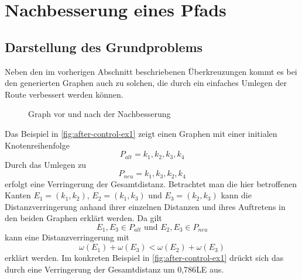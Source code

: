\section{Nachbesserung eines Pfads}
\label{sec:after-control}
\subsection{Darstellung des Grundproblems}
Neben den im vorherigen Abschnitt beschriebenen Überkreuzungen kommt es bei den generierten Graphen auch zu solchen, die durch ein einfaches Umlegen der Route verbessert werden können.

\begin{figure}[h]
    \begin{center}
    
    \hfil
    \end{center}
    \caption{Graph vor und nach der Nachbesserung}
    \label{fig:after-control-ex1}
\end{figure}

Das Beispiel in \vref{fig:after-control-ex1} zeigt einen Graphen mit einer initialen Knotenreihenfolge
$$P_{alt} = k_1,k_2,k_3,k_4$$
Durch das Umlegen zu
$$P_{neu} =k_1,k_3,k_2,k_4$$
erfolgt eine Verringerung der Gesamtdistanz.
Betrachtet man die hier betroffenen Kanten $E_1 = (k_1,k_2)$, $ E_2 = (k_1,k_3)$ und $E_3=(k_2,k_3)$ kann die Distanzverringerung anhand ihrer einzelnen Distanzen und ihres Auftretens in den beiden Graphen erklärt werden.
Da gilt 
$$E_1,E_3\in P_{alt} \textrm{ und } E_2,E_3 \in P_{neu}$$
kann eine Distanzverringerung mit
$$\omega(E_1) + \omega(E_3) < \omega(E_2) + \omega(E_3)$$
erklärt werden.
Im konkreten Beispiel in \vref{fig:after-control-ex1} drückt sich das durch eine Verringerung der Gesamtdistanz um 0,786\ac{LE} aus.


